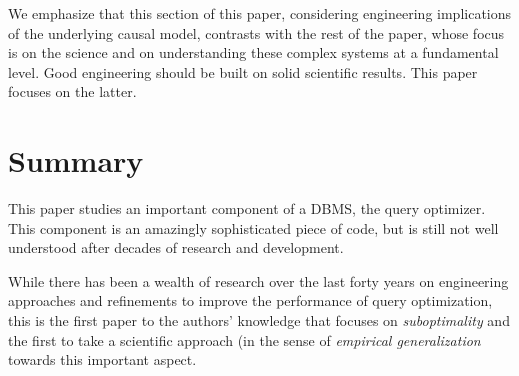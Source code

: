 \documentclass[prodmode,acmtods]{acmsmall}
\begin{document}
We emphasize that this section of this paper, considering engineering
implications of the underlying causal model, contrasts with the rest of the
paper, whose focus is on the science and on understanding these complex
systems at a fundamental level.  Good engineering should be built on solid
scientific results. This paper focuses on the latter.

\section{Summary}\label{sec:summary}

This paper studies an important
component of a \hbox{DBMS}, the query optimizer. This component is an amazingly
sophisticated piece of code, but is still not well understood after decades
of research and development.

While there has been a wealth of research over the last forty years on
engineering approaches and refinements to improve the performance of query
optimization, this is the first paper to the authors' knowledge that focuses
on {\em suboptimality} and the first to take a scientific approach (in the
sense of {\em empirical generalization} towards this important aspect.
\end{document}
